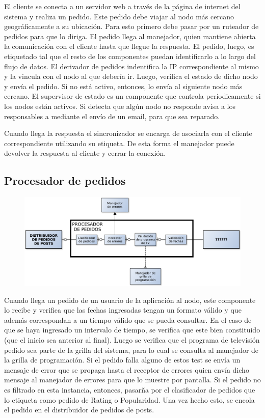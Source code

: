 El cliente se conecta a un servidor web a través de la página de internet del sistema y realiza un pedido. Este pedido debe viajar al nodo más cercano geográficamente a su ubicación. Para esto primero debe pasar por un ruteador de pedidos para que lo diriga.
El pedido llega al manejador, quien mantiene abierta la comunicación con el cliente hasta que llegue la respuesta. El pedido, luego, es etiquetado tal que el resto de los componentes puedan identificarlo a lo largo del flujo de datos. El derivador de pedidos indentifica la IP correspondiente al mismo y la vincula con el nodo al que debería ir. Luego, verifica el estado de dicho nodo y envía el pedido. Si no está activo, entonces, lo envía al siguiente nodo más cercano.
El supervisor de estado es un componente que controla períodicamente si los nodos están activos. Si detecta que algún nodo no responde avisa a los responsables a mediante el envío de un email, para que sea reparado.


Cuando llega la respuesta el sincronizador se encarga de asociarla con el cliente correspondiente utilizando su etiqueta. De esta forma el manejador puede devolver la respuesta al cliente y cerrar la conexión.

\subsection{Procesador de pedidos}

\begin{figure}[H]
\centering
\includegraphics[width=\textwidth]{graph/procpedidos.pdf}
\end{figure}

Cuando llega un pedido de un usuario de la aplicación al nodo, este componente lo recibe y verifica que las fechas ingresadas tengan un formato válido y que 
además correspondan a un tiempo válido que se pueda consultar. En el caso de que se haya ingresado un intervalo de tiempo, se verifica que este bien constituido (que el inicio sea anterior al final). Luego se verifica que el programa de televisión pedido sea parte de la grilla del sistema, para lo cual se consulta al manejador de la grilla de programación. Si el pedido falla alguno de estos test se envía un mensaje de error que se propaga hasta el receptor de errores quien envía dicho mensaje al manejador de errores para que lo muestre por pantalla. Si el pedido no es filtrado en esta instancia, entonces, pasarña por el clasificador de pedidos que lo etiqueta como pedido de Rating o Popularidad. Una vez hecho esto, se encola el pedido en el distribuidor de pedidos de posts.


